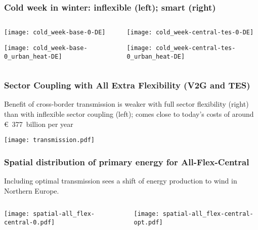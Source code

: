\documentclass[10pt,aspectratio=169,dvipsnames]{beamer}
\begin{document}
\begin{frame}
  \frametitle{Cold week in winter: inflexible (left); smart (right)}

  \begin{columns}[T]
    \begin{column}{6.5cm}
  \centering
\texttt{[image: cold\_week-base-0-DE]}

\texttt{[image: cold\_week-base-0\_urban\_heat-DE]}
    \end{column}
    \begin{column}{6.5cm}
  \centering

  \texttt{[image: cold\_week-central-tes-0-DE]}

  \texttt{[image: cold\_week-central-tes-0\_urban\_heat-DE]}
    \end{column}
  \end{columns}
\end{frame}





\begin{frame}
  \frametitle{Sector Coupling with All Extra Flexibility (V2G and TES)}

  Benefit of cross-border transmission is weaker with full sector flexibility (right) than with inflexible sector coupling (left); comes close to today's costs of around \euro~377~billion per year

  \centering
  \texttt{[image: transmission.pdf]}
\end{frame}



\begin{frame}
  \frametitle{Spatial distribution of primary energy for All-Flex-Central}

  Including optimal transmission sees a shift of energy production to wind in Northern Europe.

\begin{columns}[T]
  \begin{column}{7cm}

    \vspace{0.5cm}
  \texttt{[image: spatial-all\_flex-central-0.pdf]}

  \end{column}
  \begin{column}{7cm}

    \vspace{0.5cm}
  \texttt{[image: spatial-all\_flex-central-opt.pdf]}

  \end{column}
\end{columns}
\end{frame}
\end{document}
